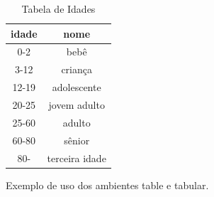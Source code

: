 \begin{figure}[hbt]
    \begin{LTXexample}[pos=b]
    \begin{table}
    \caption{Tabela de Idades}
    \centering
    \label{tab:idades}
    \begin{tabular}{|c|c|}
    \hline
    \textbf{idade} & \textbf{nome} \\
    \hline
    0-2   & bebê \\
    3-12  & criança \\
    12-19 & adolescente \\
    20-25 & jovem adulto \\
    25-60 & adulto \\
    60-80 & sênior \\
    80-   & terceira idade \\
    \hline
    \end{tabular}
    \end{table}
    \end{LTXexample}
    \caption{Exemplo de uso dos ambientes table e tabular.}
\label{fig:tabtab}
\end{figure}






